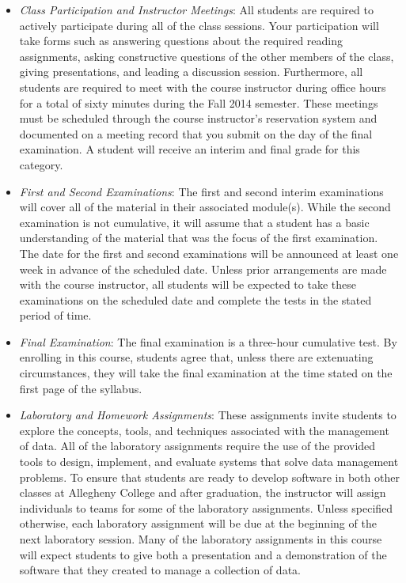 \begin{itemize}

  \item {\em Class Participation and Instructor Meetings}: All students are required to actively participate during all
    of the class sessions. Your participation will take forms such as answering questions about the required reading
    assignments, asking constructive questions of the other members of the class, giving presentations, and leading a
    discussion session. Furthermore, all students are required to meet with the course instructor during office hours
    for a total of sixty minutes during the Fall 2014 semester.  These meetings must be scheduled through the course
    instructor's reservation system and documented on a meeting record that you submit on the day of the final
    examination. A student will receive an interim and final grade for this category.

  \item {\em First and Second Examinations}: The first and second interim examinations will cover all of the material
    in their associated module(s).  While the second examination is not cumulative, it will assume that a student has a
    basic understanding of the material that was the focus of the first examination.  The date for the first and
    second examinations will be announced at least one week in advance of the scheduled date.  Unless prior
    arrangements are made with the course instructor, all students will be expected to take these examinations on the
    scheduled date and complete the tests in the stated period of time.

  \item {\em Final Examination}: The final examination is a three-hour cumulative test.  By enrolling in this course,
    students agree that, unless there are extenuating circumstances, they will take the final examination at the
    time stated on the first page of the syllabus.

  \item {\em Laboratory and Homework Assignments}: These assignments invite students to explore the concepts, tools, and
    techniques associated with the management of data.  All of the laboratory assignments require the use of the
    provided tools to design, implement, and evaluate systems that solve data management problems.  To ensure that
    students are ready to develop software in both other classes at Allegheny College and after graduation, the
    instructor will assign individuals to teams for some of the laboratory assignments.  Unless specified otherwise,
    each laboratory assignment will be due at the beginning of the next laboratory session.  Many of the laboratory
    assignments in this course will expect students to give both a presentation and a demonstration of the software that
    they created to manage a collection of data.  


\end{itemize}
